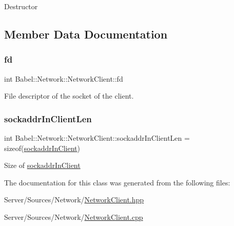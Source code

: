 Destructor 

\subsection{Member Data Documentation}
\mbox{\label{classBabel_1_1Network_1_1NetworkClient_ae1d6dc854cbc956a4bd00d059265fb02}} 
\subsubsection{\texorpdfstring{fd}{fd}}
{\footnotesize\ttfamily int Babel\+::\+Network\+::\+Network\+Client\+::fd}

File descriptor of the socket of the client. \mbox{\label{classBabel_1_1Network_1_1NetworkClient_affb6a43d2d5b005e83f740ca8f3d19f5}} 
\subsubsection{\texorpdfstring{sockaddr\+In\+Client\+Len}{sockaddrInClientLen}}
{\footnotesize\ttfamily int Babel\+::\+Network\+::\+Network\+Client\+::sockaddr\+In\+Client\+Len = sizeof(\hyperlink{structBabel_1_1Network_1_1NetworkClient_1_1sockaddrInClient}{sockaddr\+In\+Client})}

Size of \hyperlink{structBabel_1_1Network_1_1NetworkClient_1_1sockaddrInClient}{sockaddr\+In\+Client} 

The documentation for this class was generated from the following files\+:\begin{DoxyCompactItemize}
\item 
Server/\+Sources/\+Network/\hyperlink{Server_2Sources_2Network_2NetworkClient_8hpp}{Network\+Client.\+hpp}\item 
Server/\+Sources/\+Network/\hyperlink{Server_2Sources_2Network_2NetworkClient_8cpp}{Network\+Client.\+cpp}\end{DoxyCompactItemize}

